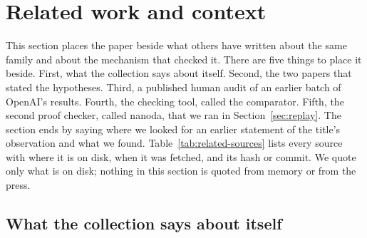\section{Related work and context}
\label{sec:related}
\begingroup\sloppy

This section places the paper beside what others have written about the
same family and about the mechanism that checked it. There are five
things to place it beside. First, what the collection says about itself. Second, the two
papers that stated the hypotheses. Third, a published human audit of an earlier
batch of OpenAI's results. Fourth, the checking tool, called the comparator. Fifth,
the second proof checker, called nanoda, that we ran in
Section~\ref{sec:replay}. The section ends by saying where we looked for
an earlier statement of the title's observation and what we found.
Table~\ref{tab:related-sources} lists every source with where it is on
disk, when it was fetched, and its hash or commit. We quote only what is
on disk; nothing in this section is quoted from memory or from the press.

\begin{table}[htbp]
\centering\small
\caption{The sources of this section. ``Clone'' is the read-only copy of
the OpenAI collection at commit \texttt{4eaee875}; ``fetched'' files were
downloaded on 2026-11-05 and are kept under \texttt{paper3/related/fetched/}
with their SHA-256 hashes. Written by
\texttt{paper3/scripts/related\_work.py}.}
\label{tab:related-sources}

\end{table}

\subsection{What the collection says about itself}
\label{sec:related-collection}

